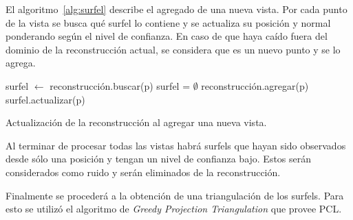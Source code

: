 	El algoritmo~\ref{alg:surfel} describe el agregado de una nueva vista.
	Por cada punto de la vista se busca qué surfel lo contiene y se actualiza
	su posición y normal ponderando según el nivel de confianza.
	En caso de que haya caído fuera del dominio de la reconstrucción actual, se
	considera que es un nuevo punto y se lo agrega.

	\begin{algorithm}
		\begin{algorithmic}[1]
					\State surfel $\gets$ reconstrucción.buscar(p)
					\If surfel = $\emptyset$
						\State reconstrucción.agregar(p)
					\Else
						\State surfel.actualizar(p)
					\EndIf
				\EndFor
			\EndFunction
		\end{algorithmic}
		\caption{\label{alg:surfel}Actualización de la reconstrucción al agregar una nueva vista.}
	\end{algorithm}

	Al terminar de procesar todas las vistas habrá surfels que hayan sido
	observados desde sólo una posición y tengan un nivel de confianza bajo.
	Estos serán considerados como ruido y serán eliminados de la
	reconstrucción.

	Finalmente se procederá a la obtención de una triangulación de los surfels.
	Para esto se utilizó el algoritmo de \emph{Greedy Projection Triangulation} que provee PCL.

